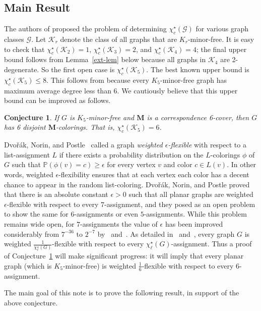 \documentclass[11pt]{article}
\newtheorem{conj}[thm]{Conjecture}
\theoremstyle{definition}
\newcommand\chisl{\chi^{\star}_{\ell}}
\newcommand\chisc{\chi^{\star}_{c}}
\renewcommand\ge{\geqslant}
\renewcommand\le{\leqslant}
\newcommand\G{\mathcal{G}}
\newcommand\K{\mathcal{K}}
\newcommand\MM{\textbf{M}}
\begin{document}
\subsection{Main Result}
The authors of \cite{CCvBDK} proposed the problem of determining $\chisc(\G)$ for various graph classes 
$\G$.  Let $\K_r$ denote the class of all graphs that are $K_r$-minor-free.  It is easy to check that 
$\chisc(\K_2)=1$, $\chisc(\K_3)=2$, and $\chisc(\K_4)=4$; the final upper bound follows from Lemma~\ref{ext-lem}
below because all graphs in $\K_4$ are 2-degenerate.  So the first open case is $\chisc(\K_5)$.
The best known upper bound is $\chisc(\K_5)\le 8$.  This follows from \cite[Theorem~1.7]{CCvBZ} because every
$K_5$-minor-free graph has maximum average degree less than 6.  We cautiously believe that this upper bound 
can be improved as follows.

\begin{conj}\label{conj1}
	If $G$ is $K_5$-minor-free and $\MM$ is a correspondence 6-cover, then $G$ has 6 disjoint 
	$\MM$-colorings.  That is, $\chisc(\K_5)=6$.
\end{conj}

Dvo\v{r}\'{a}k, Norin, and Postle~\cite{DNP19} called a graph \emph{weighted $\epsilon$-flexible} with 
respect to a list-assignment $L$ if there exists a probability distribution on the $L$-colorings $\phi$ 
of $G$ such that $\mathbb{P}(\phi(v)=c) \ge \epsilon$ for every vertex $v$ and color $c\in L(v)$.
In other words, weighted $\epsilon$-flexibility ensures that at each vertex each color has a decent chance 
to appear in the random list-coloring.  Dvo\v{r}\'{a}k, Norin, and Postle  proved that there is an absolute 
constant $\epsilon>0$ such that all planar graphs are weighted $\epsilon$-flexible with respect to every 
$7$-assignment, and they posed as an open problem to show the same for $6$-assignments or even 
$5$-assignments.  While this problem remains wide open, for $7$-assignments the value of $\epsilon$ has been 
improved considerably from $7^{-36}$ to $2^{-7}$ by~\cite{KMMP22} and~\cite{CCvB}.
As detailed in~\cite{CCvBZ} and~\cite{KMMP22}, every graph $G$ is weighted $\frac{1}{\chisl(G)}$-flexible 
with respect to every $\chisl(G)$-assignment. Thus a proof of Conjecture~\ref{conj1}  will make significant 
progress: it will imply that every planar graph (which is $K_5$-minor-free) is weighted 
$\frac{1}{6}$-flexible with respect to every $6$-assignment.
\bigskip

The main goal of this note is to prove the following result, in support of the above conjecture.
\end{document}
